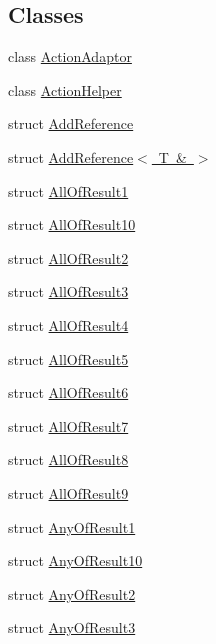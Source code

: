 \subsection*{Classes}
\begin{DoxyCompactItemize}
\item 
class \mbox{\hyperlink{classtesting_1_1internal_1_1ActionAdaptor}{Action\+Adaptor}}
\item 
class \mbox{\hyperlink{classtesting_1_1internal_1_1ActionHelper}{Action\+Helper}}
\item 
struct \mbox{\hyperlink{structtesting_1_1internal_1_1AddReference}{Add\+Reference}}
\item 
struct \mbox{\hyperlink{structtesting_1_1internal_1_1AddReference_3_01T_01_6_01_4}{Add\+Reference$<$ T \& $>$}}
\item 
struct \mbox{\hyperlink{structtesting_1_1internal_1_1AllOfResult1}{All\+Of\+Result1}}
\item 
struct \mbox{\hyperlink{structtesting_1_1internal_1_1AllOfResult10}{All\+Of\+Result10}}
\item 
struct \mbox{\hyperlink{structtesting_1_1internal_1_1AllOfResult2}{All\+Of\+Result2}}
\item 
struct \mbox{\hyperlink{structtesting_1_1internal_1_1AllOfResult3}{All\+Of\+Result3}}
\item 
struct \mbox{\hyperlink{structtesting_1_1internal_1_1AllOfResult4}{All\+Of\+Result4}}
\item 
struct \mbox{\hyperlink{structtesting_1_1internal_1_1AllOfResult5}{All\+Of\+Result5}}
\item 
struct \mbox{\hyperlink{structtesting_1_1internal_1_1AllOfResult6}{All\+Of\+Result6}}
\item 
struct \mbox{\hyperlink{structtesting_1_1internal_1_1AllOfResult7}{All\+Of\+Result7}}
\item 
struct \mbox{\hyperlink{structtesting_1_1internal_1_1AllOfResult8}{All\+Of\+Result8}}
\item 
struct \mbox{\hyperlink{structtesting_1_1internal_1_1AllOfResult9}{All\+Of\+Result9}}
\item 
struct \mbox{\hyperlink{structtesting_1_1internal_1_1AnyOfResult1}{Any\+Of\+Result1}}
\item 
struct \mbox{\hyperlink{structtesting_1_1internal_1_1AnyOfResult10}{Any\+Of\+Result10}}
\item 
struct \mbox{\hyperlink{structtesting_1_1internal_1_1AnyOfResult2}{Any\+Of\+Result2}}
\item 
struct \mbox{\hyperlink{structtesting_1_1internal_1_1AnyOfResult3}{Any\+Of\+Result3}}

\end{DoxyCompactItemize}
